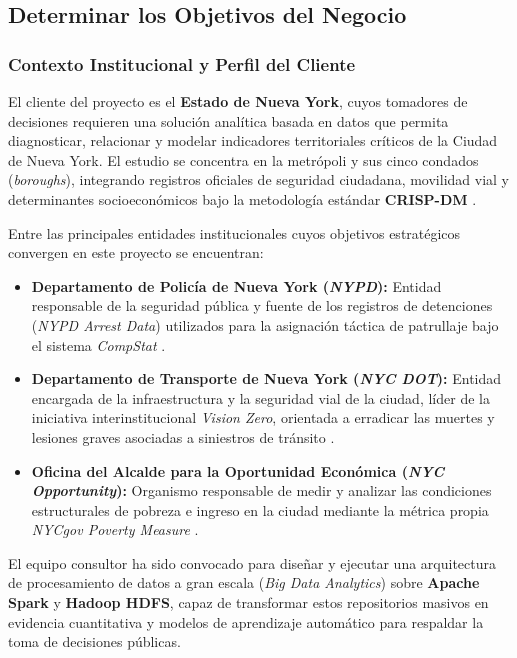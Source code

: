 \documentclass[11pt,a4paper]{article}
\begin{document}
\subsection{Determinar los Objetivos del Negocio}

\subsubsection{Contexto Institucional y Perfil del Cliente}

El cliente del proyecto es el \textbf{Estado de Nueva York}, cuyos tomadores de decisiones requieren una solución analítica basada en datos que permita diagnosticar, relacionar y modelar indicadores territoriales críticos de la Ciudad de Nueva York. El estudio se concentra en la metrópoli y sus cinco condados (\textit{boroughs}), integrando registros oficiales de seguridad ciudadana, movilidad vial y determinantes socioeconómicos bajo la metodología estándar \textbf{CRISP-DM} \cite{crisp_dm_2000}.

Entre las principales entidades institucionales cuyos objetivos estratégicos convergen en este proyecto se encuentran:

\begin{itemize}
    \item \textbf{Departamento de Policía de Nueva York (\textit{NYPD}):} Entidad responsable de la seguridad pública y fuente de los registros de detenciones (\textit{NYPD Arrest Data}) utilizados para la asignación táctica de patrullaje bajo el sistema \textit{CompStat} \cite{nypd_compstat_2024}.
    
    \item \textbf{Departamento de Transporte de Nueva York (\textit{NYC DOT}):} Entidad encargada de la infraestructura y la seguridad vial de la ciudad, líder de la iniciativa interinstitucional \textit{Vision Zero}, orientada a erradicar las muertes y lesiones graves asociadas a siniestros de tránsito \cite{vision_zero_nyc_2023}.
    
    \item \textbf{Oficina del Alcalde para la Oportunidad Económica (\textit{NYC Opportunity}):} Organismo responsable de medir y analizar las condiciones estructurales de pobreza e ingreso en la ciudad mediante la métrica propia \textit{NYCgov Poverty Measure} \cite{nyc_opportunity_2024}.
\end{itemize}

El equipo consultor ha sido convocado para diseñar y ejecutar una arquitectura de procesamiento de datos a gran escala (\textit{Big Data Analytics}) sobre \textbf{Apache Spark} y \textbf{Hadoop HDFS}, capaz de transformar estos repositorios masivos en evidencia cuantitativa y modelos de aprendizaje automático para respaldar la toma de decisiones públicas.
\end{document}
